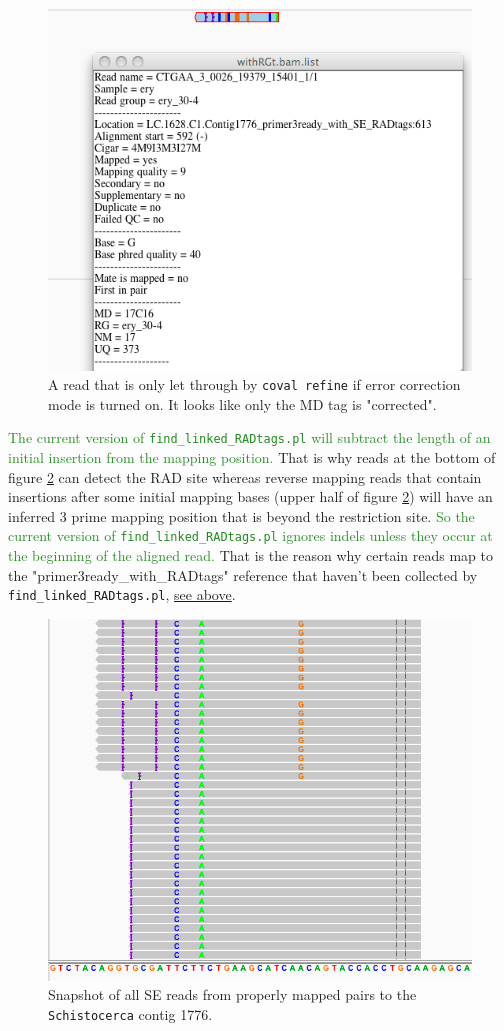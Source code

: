 \documentclass{article}\usepackage[]{graphicx}\usepackage[]{color}
\newcommand{\roger}[1]{ \textcolor[named]{ForestGreen}{#1} }
\begin{document}
\begin{figure}
\centering
\includegraphics[width=.8\textwidth]{./figure/coval-refine_err-corr}
\caption{A read that is only let through by \texttt{coval refine} if error correction mode is turned on. It looks like only the MD tag is "corrected".}
\label{coval-refine_err-corr}
\end{figure}

\roger{The current version of \texttt{find\_linked\_RADtags.pl} will subtract the length of an initial insertion from the mapping position.} That is why reads at the bottom of figure \ref{all_SE_pp_on_LC.1628.C1.Contig1776} can detect the RAD site whereas reverse mapping reads that contain insertions after some initial mapping bases (upper half of figure \ref{all_SE_pp_on_LC.1628.C1.Contig1776}) will have an inferred 3 prime mapping position that is beyond the restriction site. \roger{So the current version of \texttt{find\_linked\_RADtags.pl} ignores indels unless they occur at the beginning of the aligned read.} That is the reason why certain reads map to the "primer3ready\_with\_RADtags" reference that haven't been collected by \texttt{find\_linked\_RADtags.pl}, \hyperlink{CCGGT}{see above}.

\begin{figure}[htb]
\centering
\includegraphics[width=.7\textwidth]{./figure/all_SE_pp_on_LC_1628_C1_Contig1776}
\caption{Snapshot of all SE reads from properly mapped pairs to the \texttt{Schistocerca} contig 1776. }
\label{all_SE_pp_on_LC.1628.C1.Contig1776}
\end{figure}
\end{document}
